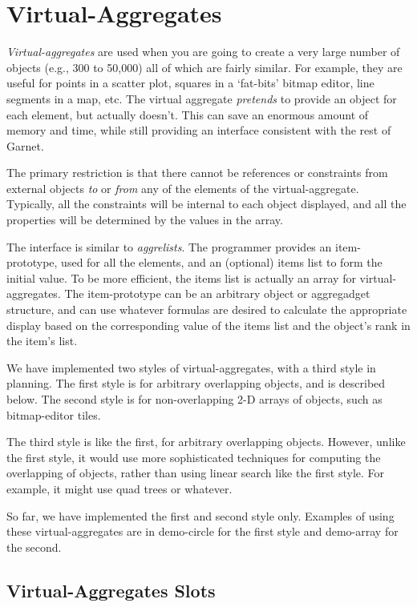 \chapter{Virtual-Aggregates}

{\it Virtual-aggregates} are used when you are going to create a very large
number of objects (e.g., 300 to 50,000) all of which are fairly similar.
For example, they are useful for points in a scatter plot, squares in
a `fat-bits' bitmap editor, line segments in a map, etc.  The virtual
aggregate {\it pretends} to provide an object for each element, but actually
doesn't.  This can save an enormous amount of memory and time, while
still providing an interface consistent with the rest of Garnet.

The primary restriction is that there cannot be references or
constraints from external objects {\it to} or {\it from} any of the
elements of the virtual-aggregate.  Typically, all the constraints
will be internal to each object displayed, and all the properties will
be determined by the values in the  array.

The interface is similar to {\it aggrelists}.  The programmer provides an
item-prototype, used for all the elements, and an (optional) items
list to form the initial value.  To be more efficient, the items list
is actually an array for virtual-aggregates.  The item-prototype can
be an arbitrary object or aggregadget structure, and can use whatever
formulas are desired to calculate the appropriate display based on the
corresponding value of the items list and the object's rank in the
item's list.

We have implemented two styles of virtual-aggregates, with
a third style in planning.
The first style is for arbitrary overlapping objects, and is described
below.  The second style is for non-overlapping 2-D arrays of objects,
such as bitmap-editor tiles.

The third style is like the first, for arbitrary overlapping objects.
However, unlike the first style, it would use more sophisticated
techniques for computing the overlapping of objects, rather than using
linear search like the first style.  For example, it might use
quad trees or whatever.

So far, we have implemented the first and second style only.  Examples
of using these virtual-aggregates are in demo-circle for the first
style and demo-array for the second.

\section{Virtual-Aggregates Slots}

